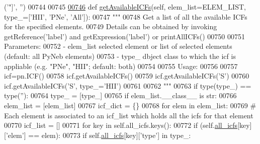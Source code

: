 \begin{DoxyCode}
{{{      (\textcolor{stringliteral}{'"]'}, \textcolor{stringliteral}{''})
00744 
00745     
\hypertarget{icf_8py_source_l00746}{}\hyperlink{classpyneb_1_1core_1_1icf_1_1_i_c_f_a45f65185e75b6f98d08656c918385b38}{00746}     \textcolor{keyword}{def }\hyperlink{classpyneb_1_1core_1_1icf_1_1_i_c_f_a45f65185e75b6f98d08656c918385b38}{getAvailableICFs}(self, elem\_list=ELEM\_LIST, type\_=['HII', 'PNe', 'All']):
00747         \textcolor{stringliteral}{""" }
00748 \textcolor{stringliteral}{        Get a list of all the available ICFs for the specified elements. }
00749 \textcolor{stringliteral}{        Details can be obtained by invoking getReference('label') and getExpression('label') or
       printAllICFs()}
00750 \textcolor{stringliteral}{        }
00751 \textcolor{stringliteral}{        Parameters:}
00752 \textcolor{stringliteral}{            - elem\_list    selected element or list of selected elements (default: all PyNeb elements)}
00753 \textcolor{stringliteral}{            - type\_         dbject class to which the icf is appliable (e.g. "PNe", "HII"; default: both)}
00754 \textcolor{stringliteral}{        }
00755 \textcolor{stringliteral}{        Usage:}
00756 \textcolor{stringliteral}{        }
00757 \textcolor{stringliteral}{        icf=pn.ICF()}
00758 \textcolor{stringliteral}{        icf.getAvailableICFs()}
00759 \textcolor{stringliteral}{        icf.getAvailableICFs('S')}
00760 \textcolor{stringliteral}{        icf.getAvailableICFs('S', type\_='HII')}
00761 \textcolor{stringliteral}{}
00762 \textcolor{stringliteral}{        """}        
00763         \textcolor{keywordflow}{if} type(type\_) == type(\textcolor{stringliteral}{''}):
00764             type\_ = [type\_] 
00765         \textcolor{keywordflow}{if} elem\_list.\_\_class\_\_ \textcolor{keywordflow}{is} str:
00766             elem\_list = [elem\_list]
00767         icf\_dict = \{\}
00768         \textcolor{keywordflow}{for} elem \textcolor{keywordflow}{in} elem\_list:
00769             \textcolor{comment}{# Each element is associated to an icf\_list which holds all the icfs for that element }
00770             icf\_list = []
00771             \textcolor{keywordflow}{for} key \textcolor{keywordflow}{in} self.all\_icfs.keys():
00772                 \textcolor{keywordflow}{if} (self.\hyperlink{classpyneb_1_1core_1_1icf_1_1_i_c_f_a854ee87a53feb102e429e902227ce88b}{all\_icfs}[key][\textcolor{stringliteral}{'elem'}] == elem):
00773                     \textcolor{keywordflow}{if} self.\hyperlink{classpyneb_1_1core_1_1icf_1_1_i_c_f_a854ee87a53feb102e429e902227ce88b}{all\_icfs}[key][\textcolor{stringliteral}{'type'}] \textcolor{keywordflow}{in} type\_:
}}}
\end{DoxyCode}
